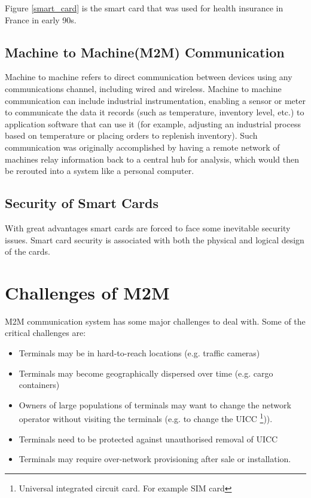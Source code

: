 \documentclass[12pt]{article}
\begin{document}
Figure \ref{smart_card} is the smart card that was used for health insurance in France in early 90s. 


\subsection{Machine to Machine(M2M) Communication}
Machine to machine refers to direct communication between devices using any communications channel, including wired and wireless. Machine to machine communication can include industrial instrumentation, enabling a sensor or meter to communicate the data it records (such as temperature, inventory level, etc.) to application software that can use it (for example, adjusting an industrial process based on temperature or placing orders to replenish inventory). Such communication was originally accomplished by having a remote network of machines relay information back to a central hub for analysis, which would then be rerouted into a system like a personal computer. 

\subsection{Security of Smart Cards}
With great advantages smart cards are forced to face some inevitable security issues. Smart card security is associated with both the physical and logical design of the cards. 

\section{Challenges of M2M}
M2M communication system has some major challenges to deal with. Some of the critical challenges are:

\begin{itemize}
\item Terminals may be in hard-to-reach locations (e.g. traffic cameras)
\item Terminals may become geographically dispersed over time (e.g. cargo containers)
\item Owners of large populations of terminals may want to change the network
operator without visiting the terminals (e.g. to change the UICC \footnote{Universal integrated circuit card. For example SIM card})).
\item Terminals need to be protected against unauthorised removal of UICC
\item Terminals may require over-network provisioning after sale or installation.
\end{itemize}
\end{document}
